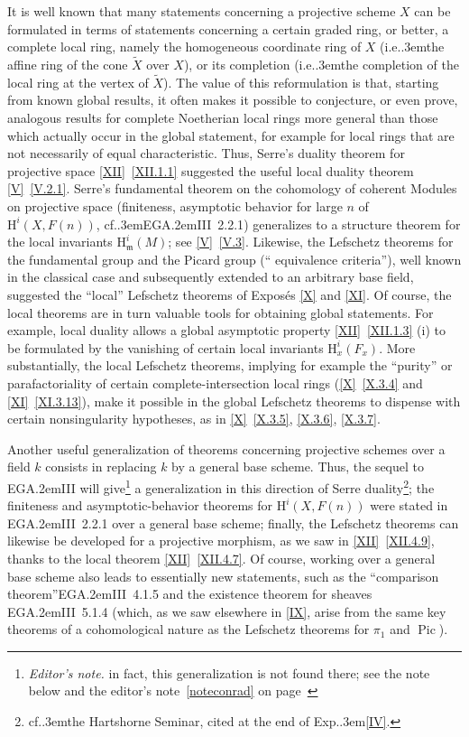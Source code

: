 \documentclass[11pt,a4paper,oneside]{book}
\providecommand{\sisi}[2]{#2}
\providecommand{\pageoriginale}{%
  \refstepcounter{pageoriginal}%
  \marginpar{\raggedright\footnotesize\bfseries\thepageoriginal}%
  \xspace}
\providecommand{\nde}[1]{\footnote{\textit{Editor's note.} #1}}
\providecommand{\sfootnote}[1]{\footnote{#1}}
\providecommand{\og}{``}
\providecommand{\fg}{''\xspace}
\providecommand{\cf}{cf.\kern.3em}
\providecommand{\ie}{i.e.\kern.3em}
\providecommand{\EGA}{\textup{EGA}\kern.2em}
\providecommand{\Exp}{Exp.\kern.3em}
\providecommand{\ideal}[1]{\mathfrak{#1}}
\providecommand{\mm}{\ideal m}
\providecommand{\Pic}{\operatorname{Pic}}
\renewcommand{\H}{\mathrm H}
\theoremstyle{plain}
\theoremstyle{definition}
\theoremstyle{remark}
\renewcommand{\Ref}[1]{\textup{\ref{#1}}}
\begin{document}
It\pageoriginale is well known that many statements concerning a projective scheme
$X$ can be formulated in terms of statements concerning
a certain graded ring, or better, a complete local ring,
\sisi{\ignorespaces}{namely} the homogeneous coordinate ring
of $X$ (\ie the affine ring of the cone $\tilde{X}$ over
$X$), or its completion (\ie the completion of the local ring at the vertex
of $\tilde{X}$). The value of this reformulation is that,
starting from known global results, it often makes it possible to
conjecture, or even prove, analogous results for complete
Noetherian local rings more general than those which
actually occur in the global statement, for example for
local rings that are not necessarily of equal
characteristic. Thus, Serre's duality theorem for
projective space \Ref{XII}~\Ref{XII.1.1} suggested the useful
local duality theorem \sisi{V.5.6}{\Ref{V}~\Ref{V.2.1}}. Serre's
fundamental theorem on the cohomology of coherent
\sisi{m}{M}odules on projective space (finiteness,
a\sisi{s}{}symptotic behavior for large $n$ of $\H^i(X,
F(n))$, {\cf \EGA III~2.2.1}) generalizes to a
structure theorem for the local invariants $\H^i_{\mm}(M)$; see
\sisi{V.5.7}{\Ref{V}~\Ref{V.3}}. Likewise, the Lefschetz theorems
for the fundamental group and the Picard group (\og
equivalence criteria\fg), well known in the
classical case and subsequently extended to an arbitrary base field,
suggested the \og local\fg Lefschetz theorems of Exposés
\Ref{X} and \Ref{XI}. Of course, the local theorems are in
turn valuable tools for obtaining global statements.
For example, local duality allows a global asymptotic property
\Ref{XII}~\Ref{XII.1.3} (i) to be formulated by the vanishing
of certain local invariants $\H_x^i(F_x)$. More
substantially, the local Lefschetz theorems, implying for
example the \og purity\fg or parafactoriality of certain
complete-intersection local rings (\Ref{X}~\Ref{X.3.4} and
\Ref{XI}~\Ref{XI.3.13}), make it possible in the global
Lefschetz theorems to dispense with certain nonsingularity
hypotheses, as in \Ref{X}~\Ref{X.3.5}, \Ref{X.3.6},
\Ref{X.3.7}.

Another\pageoriginale useful generalization of theorems concerning projective schemes over a field $k$ consists in replacing $k$ by a general base scheme. Thus, the sequel to {\EGA III} will give\nde{in fact, this generalization is not found there; see the note below and the editor's note~\eqref{noteconrad} on page~\pageref{noteconrad}} a generalization in this direction of Serre duality\sfootnote{\cf the Hartshorne Seminar, cited at the end of {\Exp \Ref{IV}}.}; the finiteness and asymptotic-behavior theorems for $\H^i(X, F(n))$ were stated in \EGA III~2.2.1 over a general base scheme; finally, the Lefschetz theorems can likewise be developed for a projective morphism, as we saw in \Ref{XII}~\Ref{XII.4.9}, thanks to the local theorem \Ref{XII}~\Ref{XII.4.7}. Of course, working over a general base scheme also leads to essentially new statements, such as the \og comparison theorem\fg \EGA III~4.1.5 and the existence theorem for sheaves \EGA III~5.1.4 (which, as we saw elsewhere in \Ref{IX}, arise from the same key theorems of a cohomological nature as the Lefschetz theorems for $\pi_1$ and $\Pic$).
\end{document}
